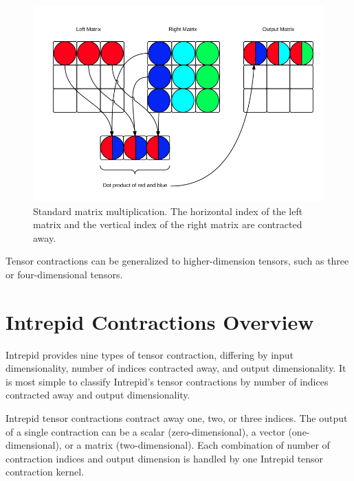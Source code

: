 \begin{figure}[h]
    \centering
    \includegraphics[scale = 0.4]{./matrix_mutiplication.png}
\caption{Standard matrix multiplication. The horizontal index of the left
    matrix and the vertical index of the right matrix are contracted away.
\label{fig:MatrixMultiplication}}
\end{figure}


Tensor contractions can be generalized to higher-dimension tensors, such as
three or four-dimensional tensors.

\section{Intrepid Contractions Overview}
Intrepid provides nine types of tensor contraction, differing by input
dimensionality, number of indices contracted away, and output dimensionality.
It is most simple to classify Intrepid's tensor contractions by number of
indices contracted away and output dimensionality.

Intrepid tensor contractions contract away one, two, or three indices. The
output of a single contraction can be a scalar (zero-dimensional), a vector
(one-dimensional), or a matrix (two-dimensional). Each combination of number of
contraction indices and output dimension is handled by one Intrepid tensor
contraction kernel.

